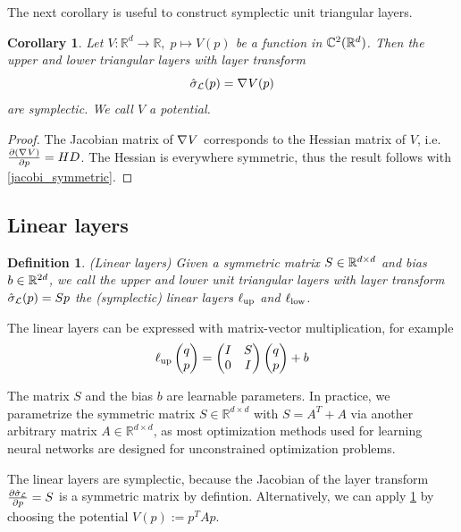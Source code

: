 \documentclass[twoside,a4paper]{article}
\newtheorem{definition}{Definition}
\newtheorem{corollary}{Corollary}
\begin{document}
The next corollary is useful to construct symplectic unit triangular layers.
\begin{corollary}\label{gradient_corollary}
	Let $V: \mathbb{R}^d \to \mathbb{R}, \; p \mapsto V(p)$ be a function in 
	$\mathbb{C}^2(\mathbb{R}^d)$. Then the upper and lower triangular layers with layer transform
	\begin{equation*}
		\hat{\sigma}_{\mathcal{L}}(p) = \nabla_{}{V}(p)
	\end{equation*}
	are symplectic. We call $V$ a potential.
\end{corollary}
\begin{proof}
	The Jacobian matrix of $\nabla_{}{V}$ corresponds to the Hessian matrix of $V$,
	i.e. $\frac{\partial (\nabla_{}{V})}{\partial p} = HD$. 
	The Hessian is everywhere symmetric, thus the result follows with \cref{jacobi_symmetric}.
\end{proof}

\subsection{Linear layers}

\begin{definition}
	(Linear layers)
	Given a symmetric matrix $S \in \mathbb{R}^{d \times d}$ and bias $b \in \mathbb{R}^{2d}$,
	we call the upper and lower unit triangular layers
	with layer transform $\hat{\sigma}_{\mathcal{L}}(p) = Sp$ the (symplectic) linear layers $\ell_{\text{up}}$ and $\ell_{\text{low}}$.
\end{definition}

The linear layers can be expressed with matrix-vector multiplication, for example
\begin{equation*}
	\ell_{\text{up}} \begin{pmatrix} q \\ p \end{pmatrix} = \begin{pmatrix}
		I & S \\
		0 & I
	\end{pmatrix} \begin{pmatrix} q \\ p \end{pmatrix} + b
\end{equation*}

The matrix $S$ and the bias $b$ are learnable parameters.
In practice, we parametrize the symmetric matrix $S\in \mathbb{R}^{d \times d}$
with $S = A^T + A$ via another arbitrary matrix $A\in \mathbb{R}^{d \times d}$, as
most optimization methods used for learning neural networks are designed for
unconstrained optimization problems.

The linear layers are symplectic, because the Jacobian of the layer transform $\frac{\partial \hat{\sigma}_{\mathcal{L}}}{\partial p} = S$
is a symmetric matrix by defintion. Alternatively, we can apply \cref{gradient_corollary} by
choosing the potential $V(p) := p^TAp$.
\end{document}
